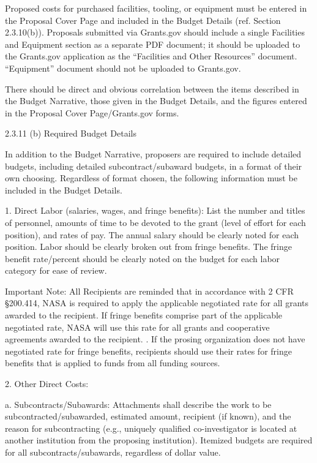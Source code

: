 \documentclass[12pt]{article}
\begin{document}
Proposed costs for purchased facilities, tooling, or equipment must be
entered in the Proposal Cover Page and included in the Budget Details
(ref. Section 2.3.10(b)). Proposals submitted via Grants.gov should
include a single Facilities and Equipment section as a separate PDF
document; it should be uploaded to the Grants.gov application as the
``Facilities and Other Resources'' document. ``Equipment'' document should
not be uploaded to Grants.gov.

There should be direct and obvious correlation between the items
described in the Budget Narrative, those given in the Budget Details,
and the figures entered in the Proposal Cover Page/Grants.gov forms.

2.3.11 (b) Required Budget Details

In addition to the Budget Narrative, proposers are required to include
detailed budgets, including detailed subcontract/subaward budgets, in
a format of their own choosing. Regardless of format chosen, the
following information must be included in the Budget Details.

1. Direct Labor (salaries, wages, and fringe benefits): List the
   number and titles of personnel, amounts of time to be devoted to
   the grant (level of effort for each position), and rates of
   pay. The annual salary should be clearly noted for each
   position. Labor should be clearly broken out from fringe
   benefits. The fringe benefit rate/percent should be clearly noted
   on the budget for each labor category for ease of review.

Important Note: All Recipients are reminded that in accordance with 2
CFR \S 200.414, NASA is required to apply the applicable negotiated
rate for all grants awarded to the recipient. If fringe benefits
comprise part of the applicable negotiated rate, NASA will use this
rate for all grants and cooperative agreements awarded to the
recipient. . If the prosing organization does not have negotiated rate
for fringe benefits, recipients should use their rates for fringe
benefits that is applied to funds from all funding sources.



2. Other
Direct Costs:

a. Subcontracts/Subawards: Attachments shall describe the work to be
subcontracted/subawarded, estimated amount, recipient (if known), and
the reason for subcontracting (e.g., uniquely qualified
co-investigator is located at another institution from the proposing
institution). Itemized budgets are required for all
subcontracts/subawards, regardless of dollar value.
\end{document}
